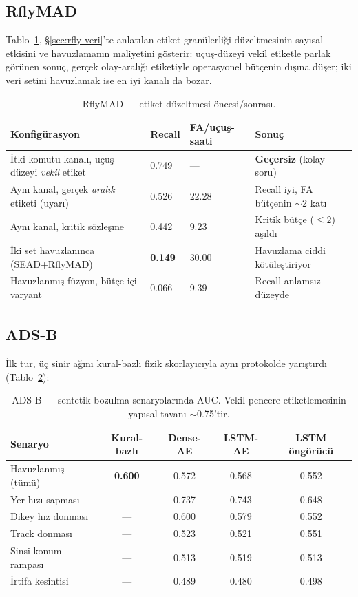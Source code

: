 \documentclass[11pt,a4paper]{article}
\begin{document}
\subsection{RflyMAD}
\label{sec:rfly-sonuc}

Tablo~\ref{tab:rfly-sonuclar}, \S\ref{sec:rfly-veri}'te anlatılan etiket
granülerliği düzeltmesinin sayısal etkisini ve havuzlamanın maliyetini
gösterir: uçuş-düzeyi vekil etiketle parlak görünen sonuç, gerçek olay-aralığı
etiketiyle operasyonel bütçenin dışına düşer; iki veri setini havuzlamak ise
en iyi kanalı da bozar.

\begin{table}[h]
\centering\small
\caption{RflyMAD --- etiket düzeltmesi öncesi/sonrası.}
\label{tab:rfly-sonuclar}
\begin{tabular}{p{6cm}p{2.6cm}p{3cm}p{3cm}}
\toprule
Konfigürasyon & Recall & FA/uçuş-saati & Sonuç \\
\midrule
İtki komutu kanalı, uçuş-düzeyi \emph{vekil} etiket & 0.749 & --- &
\textbf{Geçersiz} (kolay soru) \\
Aynı kanal, gerçek \emph{aralık} etiketi (uyarı) & 0.526 & 22.28 & Recall iyi,
FA bütçenin $\sim$2 katı \\
Aynı kanal, kritik sözleşme & 0.442 & 9.23 & Kritik bütçe ($\leq 2$) aşıldı \\
İki set havuzlanınca (SEAD+RflyMAD) & \textbf{0.149} & 30.00 & Havuzlama ciddi
kötüleştiriyor \\
Havuzlanmış füzyon, bütçe içi varyant & 0.066 & 9.39 & Recall anlamsız düzeyde \\
\bottomrule
\end{tabular}
\end{table}

\subsection{ADS-B}
\label{sec:adsb-sonuc}

İlk tur, üç sinir ağını kural-bazlı fizik skorlayıcıyla aynı protokolde
yarıştırdı (Tablo~\ref{tab:adsb-auc}):

\begin{table}[h]
\centering\small
\caption{ADS-B --- sentetik bozulma senaryolarında AUC. Vekil pencere
etiketlemesinin yapısal tavanı $\sim$0.75'tir.}
\label{tab:adsb-auc}
\begin{tabular}{lcccc}
\toprule
Senaryo & Kural-bazlı & Dense-AE & LSTM-AE & LSTM öngörücü \\
\midrule
Havuzlanmış (tümü) & \textbf{0.600} & 0.572 & 0.568 & 0.552 \\
Yer hızı sapması & --- & 0.737 & 0.743 & 0.648 \\
Dikey hız donması & --- & 0.600 & 0.579 & 0.552 \\
Track donması & --- & 0.523 & 0.521 & 0.551 \\
Sinsi konum rampası & --- & 0.513 & 0.519 & 0.513 \\
İrtifa kesintisi & --- & 0.489 & 0.480 & 0.498 \\
\bottomrule
\end{tabular}
\end{table}
\end{document}
